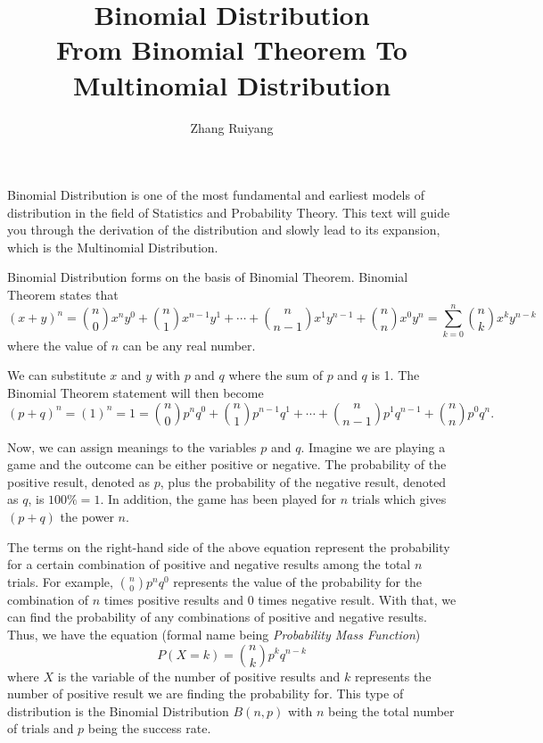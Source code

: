 \documentclass{article}
\title{Binomial Distribution\\
	\large From Binomial Theorem To Multinomial Distribution}
\author{Zhang Ruiyang}
\date{}
\theoremstyle{definition}
\begin{document}
\maketitle

\noindent Binomial Distribution is one of the most fundamental and earliest models of distribution in the field of Statistics and Probability Theory. This text will guide you through the derivation of the distribution and slowly lead to its expansion, which is the Multinomial Distribution. 

\bigskip

\noindent Binomial Distribution forms on the basis of Binomial Theorem. Binomial Theorem states that
\[
(x+y)^n = {n \choose 0}x^n y^0 + {n \choose 1}x^{n-1} y^1 + \cdots + {n \choose n-1}x^1 y^{n-1} + {n \choose n}x^{0} y^n = \sum^n_{k=0}{n \choose k}x^{k}y^{n-k}
\]
where the value of $n$ can be any real number.

\bigskip

\noindent We can substitute $x$ and $y$ with $p$ and $q$ where the sum of $p$ and $q$ is 1. The Binomial Theorem statement will then become 
\[
(p+q)^n = (1)^n = 1 = {n \choose 0}p^n q^0 + {n \choose 1}p^{n-1} q^1 + \cdots + {n \choose n-1}p^1 q^{n-1} + {n \choose n}p^{0} q^n.
\]

\bigskip 

\noindent Now, we can assign meanings to the variables $p$ and $q$. Imagine we are playing a game and the outcome can be either positive or negative. The probability of the positive result, denoted as $p$, plus the probability of the negative result, denoted as $q$, is $100\% = 1$. In addition, the game has been played for $n$ trials which gives $(p+q)$ the power $n$. 

\bigskip

\noindent The terms on the right-hand side of the above equation represent the probability for a certain combination of positive and negative results among the total $n$ trials. For example, ${n \choose 0}p^n q^0$ represents the value of the probability for the combination of $n$ times positive results and 0 times negative result. With that, we can find the probability of any combinations of positive and negative results. Thus, we have the equation (formal name being \emph{Probability Mass Function})
\[
P(X= k) = {n \choose k}p^k q^{n-k}
\]
where $X$ is the variable of the number of positive results and $k$ represents the number of positive result we are finding the probability for. This type of distribution is the Binomial Distribution $B(n,p)$ with $n$ being the total number of trials and $p$ being the success rate. 
\end{document}
